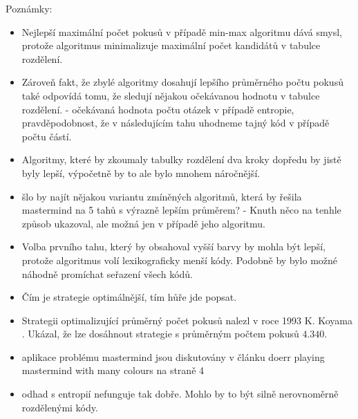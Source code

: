 Poznámky:
\begin{itemize}
    \item Nejlepší maximální počet pokusů v případě min-max algoritmu dává smysl, protože algoritmus minimalizuje maximální počet kandidátů v tabulce rozdělení. 
    \item Zároveň fakt, že zbylé algoritmy dosahují lepšího průměrného počtu pokusů také odpovídá tomu, že sledují nějakou očekávanou hodnotu v tabulce rozdělení. - očekávaná hodnota počtu otázek v případě entropie, pravděpodobnost, že v následujícím tahu uhodneme tajný kód v případě počtu částí. 
    \item Algoritmy, které by zkoumaly tabulky rozdělení dva kroky dopředu by jistě byly lepší, výpočetně by to ale bylo mnohem náročnější.
    \item šlo by najít nějakou variantu zmíněných algoritmů, která by řešila mastermind na 5 tahů s výrazně lepším průměrem? - Knuth něco na tenhle způsob ukazoval, ale možná jen v případě jeho algoritmu.
    \item Volba prvního tahu, který by obsahoval vyšší barvy by mohla být lepší, protože algoritmus volí lexikograficky menší kódy. Podobně by bylo možné náhodně promíchat seřazení všech kódů. 
    \item Čím je strategie optimálnější, tím hůře jde popsat.
    \item Strategii optimalizující průměrný počet pokusů nalezl v roce 1993 K. Koyama \cite{koyama}. Ukázal, že lze dosáhnout strategie s průměrným počtem pokusů $4.340$.
    \item aplikace problému mastermind jsou diskutovány v článku doerr playing mastermind with many colours na straně 4
    \item odhad s entropií nefunguje tak dobře. Mohlo by to být silně nerovnoměrně rozdělenými kódy. 
\end{itemize}




